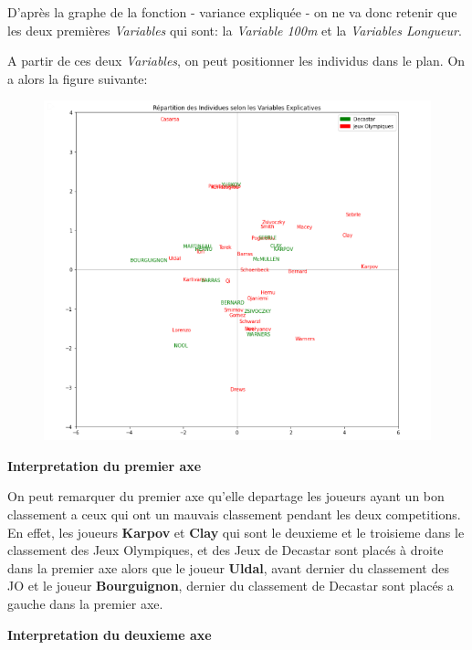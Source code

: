 \documentclass{article}
\begin{document}
D'après la graphe de la fonction - variance expliquée - on ne va donc retenir que les deux premières \textit{Variables} qui sont: la \textit{Variable 100m} et la \textit{Variables Longueur}.

\newpage

A partir de ces deux \textit{Variables}, on peut positionner les individus dans le plan. On a alors la figure suivante:

\begin{figure}[h!]
\includegraphics[width=\linewidth]{images/graph-plan.png}
\end{figure}

\begin{flushleft}
\textbf{Interpretation du premier axe}
\end{flushleft}

On peut remarquer du premier axe qu'elle departage les joueurs ayant un bon classement a ceux qui ont un mauvais classement pendant les deux competitions.
En effet, les joueurs \textbf{Karpov} et \textbf{Clay} qui sont le deuxieme et le troisieme dans le classement des Jeux Olympiques, et des Jeux de Decastar sont placés à droite dans la premier axe alors que le joueur \textbf{Uldal}, avant dernier du classement des JO et le joueur \textbf{Bourguignon}, dernier du classement de Decastar sont placés a gauche dans la premier axe. 

\begin{flushleft}
\textbf{Interpretation du deuxieme axe}
\end{flushleft}
\end{document}
